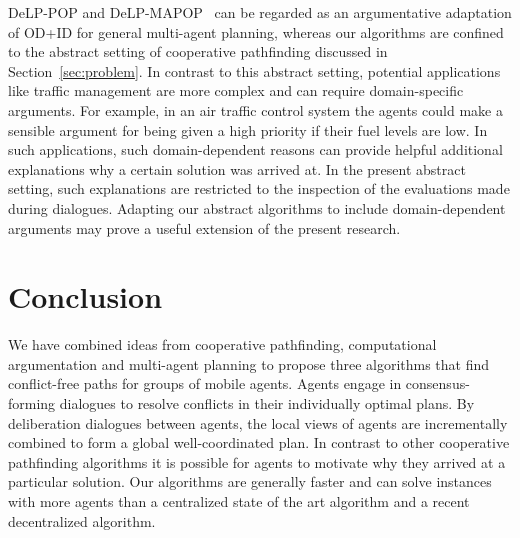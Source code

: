 \textsf{DeLP-POP} and \textsf{DeLP-MAPOP}~\cite{pardo2011,ferrando2012} can be regarded as an argumentative adaptation of OD+ID for general multi-agent planning, whereas our algorithms are confined to the abstract setting of cooperative pathfinding discussed in Section~\ref{sec:problem}.
%
In contrast to this abstract setting, potential applications like traffic management are more complex and 
can require domain-specific arguments. For example, in an air traffic control 
system the agents could make a sensible argument for being given a high priority if their fuel 
levels are low.
In such applications, such domain-dependent reasons can provide helpful additional explanations why a certain solution was 
arrived at. In the present abstract setting, such explanations are restricted to the inspection of the evaluations 
made during dialogues. Adapting our abstract algorithms to include domain-dependent arguments may prove a useful extension of the present research.

\section{Conclusion}
We have combined ideas from cooperative pathfinding, computational 
argumentation and multi-agent planning to propose three algorithms that find 
conflict-free paths for groups of mobile agents. Agents engage in 
consensus-forming dialogues to resolve conflicts in their individually optimal 
plans. By 
deliberation dialogues between agents, the local views of 
agents are incrementally combined to form a global well-coordinated plan.
In contrast to other cooperative pathfinding algorithms it is possible for 
agents to motivate why they arrived at a particular solution.
Our algorithms are generally faster and can solve instances with more agents than a 
centralized state of the art algorithm and a recent decentralized algorithm.
